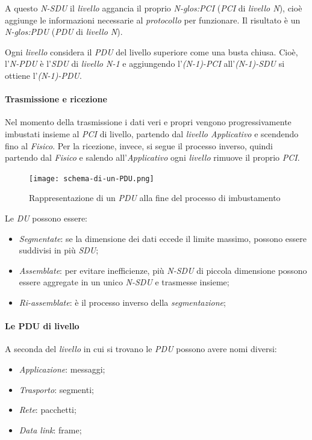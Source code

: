 A questo \emph{N-SDU} il \emph{livello} aggancia il proprio \emph{N-\gls{glos:PCI}}
(\emph{PCI} di \emph{livello N}), cioè aggiunge le informazioni necessarie al
\emph{protocollo} per funzionare. Il risultato è un \emph{N-\gls{glos:PDU}}
(\emph{PDU} di \emph{livello N}).

Ogni \emph{livello} considera il \emph{PDU} del livello superiore come una busta
chiusa. Cioè, l'\emph{N-PDU} è l'\emph{SDU} di \emph{livello N-1} e aggiungendo
l'\emph{(N-1)-PCI} all'\emph{(N-1)-SDU} si ottiene l'\emph{(N-1)-PDU}.

\paragraph{Trasmissione e ricezione}
Nel momento della trasmissione i dati veri e propri vengono progressivamente
imbustati insieme al \emph{PCI} di livello, partendo dal \emph{livello Applicativo}
e scendendo fino al \emph{Fisico}. Per la ricezione, invece, si segue il processo
inverso, quindi partendo dal \emph{Fisico} e salendo all'\emph{Applicativo} ogni
\emph{livello} rimuove il proprio \emph{PCI}.

\begin{figure}[h]
    \centering
    \texttt{[image: schema-di-un-PDU.png]}
    \caption{Rappresentazione di un \emph{PDU} alla fine del processo di imbustamento}
\end{figure}\noindent
Le \emph{DU} possono essere:
\begin{itemize}
    \item \emph{Segmentate}: se la dimensione dei dati eccede il limite massimo,
    possono essere suddivisi in più \emph{SDU};
    \item \emph{Assemblate}: per evitare inefficienze, più \emph{N-SDU} di piccola
    dimensione possono essere aggregate in un unico \emph{N-SDU} e trasmesse insieme;
    \item \emph{Ri-assemblate}: è il processo inverso della \emph{segmentazione};
\end{itemize}

\paragraph{Le PDU di livello}
A seconda del \emph{livello} in cui si trovano le \emph{PDU} possono avere nomi
diversi:
\begin{itemize}
    \item \emph{Applicazione}: messaggi;
    \item \emph{Trasporto}: segmenti;
    \item \emph{Rete}: pacchetti;
    \item \emph{Data link}: frame;
\end{itemize}